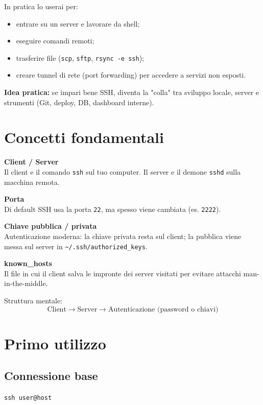 \documentclass[a4paper,11pt]{article}
\begin{document}
In pratica lo userai per:
\begin{itemize}[leftmargin=1.2cm]
    \item entrare su un server e lavorare da shell;
    \item eseguire comandi remoti;
    \item trasferire file (\texttt{scp}, \texttt{sftp}, \texttt{rsync -e ssh});
    \item creare tunnel di rete (port forwarding) per accedere a servizi non esposti.
\end{itemize}

\begin{tipbox}
\textbf{Idea pratica:} se impari bene SSH, diventa la "colla" tra sviluppo locale, server e strumenti (Git, deploy, DB, dashboard interne).
\end{tipbox}

\section{Concetti fondamentali}
\begin{infobox}
\textbf{Client / Server} \\
Il client e il comando \texttt{ssh} sul tuo computer. Il server e il demone \texttt{sshd} sulla macchina remota.

\medskip
\textbf{Porta} \\
Di default SSH usa la porta \texttt{22}, ma spesso viene cambiata (es. \texttt{2222}).

\medskip
\textbf{Chiave pubblica / privata} \\
Autenticazione moderna: la chiave privata resta sul client; la pubblica viene messa sul server in \texttt{\textasciitilde/.ssh/authorized\_keys}.

\medskip
\textbf{known\_hosts} \\
Il file in cui il client salva le impronte dei server visitati per evitare attacchi man-in-the-middle.
\end{infobox}

Struttura mentale:
\[
\text{Client} \rightarrow \text{Server} \rightarrow \text{Autenticazione (password o chiavi)}
\]

\section{Primo utilizzo}
\subsection{Connessione base}
\begin{codebox}
\texttt{ssh user@host}
\end{codebox}
\end{document}
